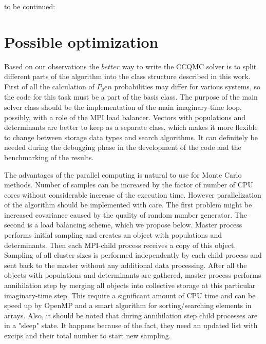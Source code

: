 \documentclass[twoside,english]{uiofysmaster}
\begin{document}
to be continued:\\

% 
%








\section{Possible optimization}
Based on our observations the $better$ way to write the CCQMC solver
is to split different parts of the algorithm into the class structure
described in this work.  First of all the calculation of $P_gen$
probabilities may differ for various systems, so the code for this
task must be a part of the basis class.  The purpose of the main
solver class should be the implementation of the main imaginary-time loop,
possibly, with a role of the MPI load balancer.  Vectors with
populations and determinants are better to keep as a separate class,
which makes it more flexible to change between storage data types and
search algorithms. It can definitely be needed during the debugging phase
in the development of the code and the benchmarking of the results.

The advantages of the parallel computing is natural to use for Monte
Carlo methods. Number of samples can be increased by the factor of
number of CPU cores without considerable increase of the execution
time. However parallelization of the algorithm should be implemented
with care. The first problem might be increased covariance caused by
the quality of random number generator. The second is a load balancing
scheme, which we propose below.  Master process performs initial
sampling and creates an object with populations and determinants. Then
each MPI-child process receives a copy of this object. Sampling of all
cluster sizes is performed independently by each child process and
sent back to the master without any additional data processing.  After
all the objects with populations and determinants are gathered, master
process performs annihilation step by merging all objects into
collective storage at this particular imaginary-time step. This
require a significant amount of CPU time and can be speed up by OpenMP
and a smart algorithm for sorting/searching elements in arrays.  Also,
it should be noted that during annihilation step child processes are
in a "sleep" state. It happens because of the fact, they need an
updated list with excips and their total number to start new sampling.
\end{document}
